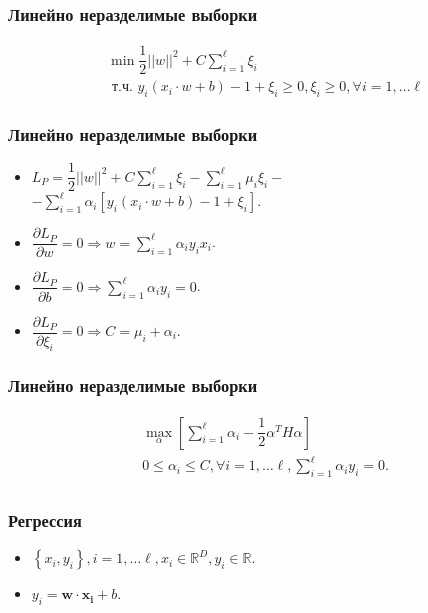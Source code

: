 \documentclass[14pt]{beamer}
\begin{document}
\begin{frame}
\frametitle{Линейно неразделимые выборки}
\begin{align*}
  &\min \dfrac{1}{2}||w||^2 + C\sum\limits_{i = 1}^{\ell}\xi_i\\
  &\text{ т.ч. } y_i(x_i \cdot w + b) - 1 + \xi_i \geqslant 0, \xi_i \geqslant 0, {\forall i = 1, \ldots \ell}
\end{align*}
\end{frame}

\begin{frame}
\frametitle{Линейно неразделимые выборки}
\begin{itemize}
  \item<1-> ${L_P = \dfrac{1}{2}||w||^2 + C\sum\limits_{i = 1}^{\ell}\xi_i
      - \sum\limits_{i = 1}^{\ell}\mu_i\xi_i} - $
      ${- \sum\limits_{i = 1}^{\ell}\alpha_i[y_i(x_i \cdot w + b) - 1 + \xi_i]}$.
  \item<2-> $\dfrac{\partial L_P}{\partial w} = 0 \Rightarrow
      w = \sum\limits_{i = 1}^{\ell}\alpha_iy_ix_i$.
  \item<3-> $\dfrac{\partial L_P}{\partial b} = 0 \Rightarrow
      \sum\limits_{i = 1}^{\ell}\alpha_iy_i = 0$.
  \item<4-> $\dfrac{\partial L_P}{\partial \xi_i} = 0 \Rightarrow
      C = \mu_i + \alpha_i$.
\end{itemize}
\end{frame}

\begin{frame}
\frametitle{Линейно неразделимые выборки}
\begin{align*}
  &\underset{\alpha}{\max}\left[\sum\limits_{i = 1}^{\ell}\alpha_i - \dfrac{1}{2}\alpha^TH\alpha\right]\\
  &0 \leqslant \alpha_i \leqslant C, \forall i = 1, \ldots \ell,
   \sum\limits_{i = 1}^{\ell}\alpha_iy_i = 0.\\
\end{align*}
\end{frame}

\begin{frame}
\frametitle{Регрессия}
\begin{itemize}
\item<1-> $\left\{x_i, y_i\right\}, i = 1, \ldots \ell,
    x_i \in \mathbb{R}^D, y_i \in \mathbb{R}$.
\item<2-> $y_i = \mathbf{w} \cdot \mathbf{x_i} + b$.
\end{itemize}
\end{frame}
\end{document}
